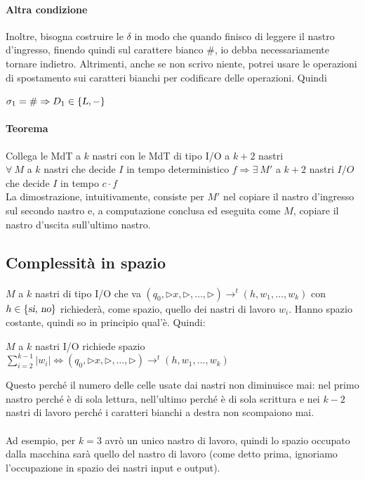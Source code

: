 \documentclass[10pt]{book}
\begin{document}
\paragraph{Altra condizione} Inoltre, bisogna costruire le $\delta$ in modo che quando finisco di leggere il nastro d'ingresso, finendo quindi sul carattere bianco $\#$, io debba necessariamente tornare indietro. Altrimenti, anche se non scrivo niente, potrei usare le operazioni di spostamento sui caratteri bianchi per codificare delle operazioni. Quindi \begin{list}{}{}
	\item $\sigma_1 = \# \Rightarrow D_1 \in \{\textsl{L}, -\}$
\end{list}
\paragraph{Teorema} Collega le MdT a $k$ nastri con le MdT di tipo I/O a $k+2$ nastri\\$\forall\:M$ a $k$ nastri che decide $I$ in tempo deterministico $f\Rightarrow\exists\:M'$ a $k+2$ nastri $I/O$ che decide $I$ in tempo $c\cdot f$\\
La dimostrazione, intuitivamente, consiste per $M'$ nel copiare il nastro d'ingresso sul secondo nastro e, a computazione conclusa ed eseguita come $M$, copiare il nastro d'uscita sull'ultimo nastro.
\subsection{Complessità in spazio}
\paragraph{} $M$ a $k$ nastri di tipo I/O che va $(q_0, \triangleright x, \triangleright, \ldots, \triangleright) \rightarrow^t (h, w_1, \ldots, w_k)$ con $h \in \{\textsl{si, no}\}$ richiederà, come spazio, quello dei nastri di lavoro $w_i$. Hanno spazio costante, quindi so in principio qual'è. Quindi:
\begin{list}{}{}
	\item $M$ a $k$ nastri I/O richiede spazio $\sum_{i=2}^{k-1} |w_i| \Leftrightarrow (q_0, \triangleright x, \triangleright, \ldots, \triangleright) \rightarrow^t (h, w_1, \ldots, w_k)$
\end{list}
Questo perché il numero delle celle usate dai nastri non diminuisce mai: nel primo nastro perché è di sola lettura, nell'ultimo perché è di sola scrittura e nei $k-2$ nastri di lavoro perché i caratteri bianchi a destra non scompaiono mai.\\\\
Ad esempio, per $k = 3$ avrò un unico nastro di lavoro, quindi lo spazio occupato dalla macchina sarà quello del nastro di lavoro (come detto prima, ignoriamo l'occupazione in spazio dei nastri input e output).
\end{document}

